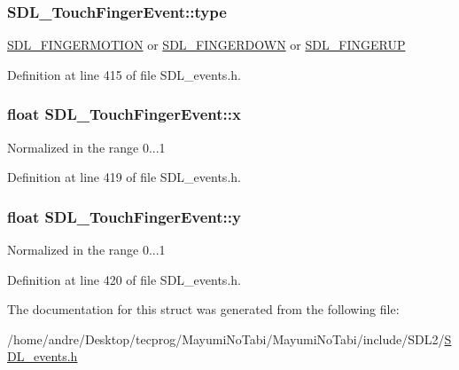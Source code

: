 \hypertarget{struct_s_d_l___touch_finger_event_a3883218fa3426065ca66086c100edbfa}{
\subsubsection[{type}]{ S\-D\-L\-\_\-\-Touch\-Finger\-Event\-::type}}\label{struct_s_d_l___touch_finger_event_a3883218fa3426065ca66086c100edbfa}
\hyperlink{_s_d_l__events_8h_a3b589e89be6b35c02e0dd34a55f3fccaa1862d7d009ade2c79b2f1fe4a30c9dd2}{S\-D\-L\-\_\-\-F\-I\-N\-G\-E\-R\-M\-O\-T\-I\-O\-N} or \hyperlink{_s_d_l__events_8h_a3b589e89be6b35c02e0dd34a55f3fccaaa712d1fa8bb69f6042e24a31e835a9ec}{S\-D\-L\-\_\-\-F\-I\-N\-G\-E\-R\-D\-O\-W\-N} or \hyperlink{_s_d_l__events_8h_a3b589e89be6b35c02e0dd34a55f3fccaa8266a108a628cc698c5172e72c1fc1e6}{S\-D\-L\-\_\-\-F\-I\-N\-G\-E\-R\-U\-P} 

Definition at line 415 of file S\-D\-L\-\_\-events.\-h.

\hypertarget{struct_s_d_l___touch_finger_event_a0ce44b1342220fa17e9b9b4a77c2c906}{
\subsubsection[{x}]{\setlength{\rightskip}{0pt plus 5cm}float S\-D\-L\-\_\-\-Touch\-Finger\-Event\-::x}}\label{struct_s_d_l___touch_finger_event_a0ce44b1342220fa17e9b9b4a77c2c906}
Normalized in the range 0...1 

Definition at line 419 of file S\-D\-L\-\_\-events.\-h.

\hypertarget{struct_s_d_l___touch_finger_event_ac2bb8af638d2927a8e13f6ffe8f9384e}{
\subsubsection[{y}]{\setlength{\rightskip}{0pt plus 5cm}float S\-D\-L\-\_\-\-Touch\-Finger\-Event\-::y}}\label{struct_s_d_l___touch_finger_event_ac2bb8af638d2927a8e13f6ffe8f9384e}
Normalized in the range 0...1 

Definition at line 420 of file S\-D\-L\-\_\-events.\-h.



The documentation for this struct was generated from the following file\-:\begin{DoxyCompactItemize}
\item 
/home/andre/\-Desktop/tecprog/\-Mayumi\-No\-Tabi/\-Mayumi\-No\-Tabi/include/\-S\-D\-L2/\hyperlink{_s_d_l__events_8h}{S\-D\-L\-\_\-events.\-h}\end{DoxyCompactItemize}
